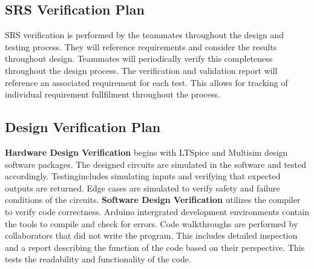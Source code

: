 \documentclass[12pt, titlepage]{article}
\begin{document}
\subsection{SRS Verification Plan}
SRS verification is performed by the teammates throughout the design and testing 
process. They will reference requirements and consider the results throughout design. 
Teammates will periodically verify this completeness throughout the design process. 
The verification and validation report will reference an associated requirement for 
each test. This allows for tracking of individual requirement fullfilment 
throughout the process. 


\subsection{Design Verification Plan}
\textbf{Hardware Design Verification} begins with LTSpice and Multisim design software
packages. The designed circuits are simulated in the software and tested accordingly.
Testingincludes simulating inputs and verifying that expected outputs are returned. 
Edge cases are simulated to verify safety and failure conditions of the circuits. 
\newline
\newline
\textbf{Software Design Verification} utilizes the compiler to verify code correctness. 
Arduino intergrated development environments contain the tools to compile and check for 
errors. Code walkthroughs are performed by collaborators that did not write the program. 
This includes detailed inspection and a report describing the function of the code 
based on their perspective. This tests the readability and functionality of 
the code. 
\end{document}
